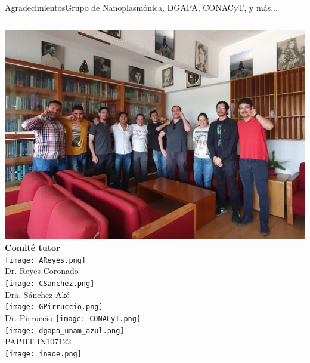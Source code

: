 
\begin{frame}{Agradecimientos}{Grupo de Nanoplasmónica, DGAPA, CONACyT, y más...}%

 \begin{columns}
    \centering
    \includegraphics[width = .9\textwidth]{grupo3.jpg}
 \centering
 \textbf{\large Comité tutor}\\[1em]
       \texttt{[image: AReyes.png]}\\ {\small Dr. Reyes Coronado}\\[.75em]
        \texttt{[image: CSanchez.png]}\\ {\small Dra. Sánchez Aké}\\[.75em]
         \texttt{[image: GPirruccio.png]}\\ {\small Dr. Pirruccio}
 \centering
 \texttt{[image: CONACyT.png]}\\[2em]
 \texttt{[image: dgapa\_unam\_azul.png]}\\
 {\small PAPIIT IN107122}\\[2em]
 \texttt{[image: inaoe.png]}
\end{columns}
\end{frame}
